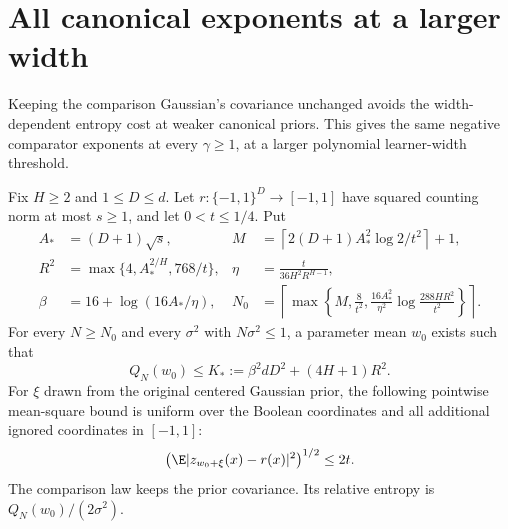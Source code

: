 \section{All canonical exponents at a larger width}
\label{sec:all-canonical}
Keeping the comparison Gaussian's covariance unchanged avoids the width-dependent entropy cost at weaker canonical priors. This gives the same negative comparator exponents at every $\gamma\ge1$, at a larger polynomial learner-width threshold.

\begin{lemma}
\label{lem:native-memorizer}
Fix $H\ge2$ and $1\le D\le d$. Let $r:\{-1,1\}^D\to[-1,1]$ have squared counting norm at most $s\ge1$, and let $0<t\le1/4$. Put
\begin{align*}
 A_*&=(D+1)\sqrt s,&
 M&=\left\lceil2(D+1)A_*^2\log2/t^2\right\rceil+1,\\
 R^2&=\max\{4,A_*^{2/H},768/t\},&
 \eta&=\frac{t}{36H^2R^{H-1}},\\
 \beta&=16+\log(16A_*/\eta),&
 N_0&=\left\lceil\max\left\{M,\frac8{t^2},
 \frac{16A_*^2}{\eta^2}\log\frac{288HR^2}{t^2}\right\}\right\rceil.
\end{align*}
For every $N\ge N_0$ and every $\sigma^2$ with $N\sigma^2\le1$, a parameter mean $w_0$ exists such that
\[
 Q_N(w_0)\le K_*:=\beta^2dD^2+(4H+1)R^2.
\]
For $\xi$ drawn from the original centered Gaussian prior, the following pointwise mean-square bound is uniform over the Boolean coordinates and all additional ignored coordinates in $[-1,1]$:
\[
 \left(\E|z_{w_0+\xi}(x)-r(x)|^2\right)^{1/2}\le2t.
\]
The comparison law keeps the prior covariance. Its relative entropy is $Q_N(w_0)/(2\sigma^2)$.
\end{lemma}
